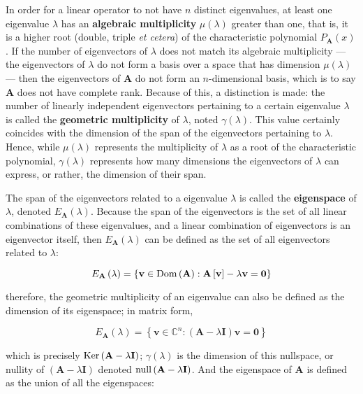 	In order for a linear operator to not have $n$ distinct eigenvalues, at least one eigenvalue $\lambda$ has an \textbf{algebraic multiplicity} $\mu\left(\lambda\right)$ greater than one, that is, it is a higher root (double, triple \textit{et cetera}) of the characteristic polynomial $P_\mathbf{A}(x)$. If the number of eigenvectors of $\lambda$ does not match its algebraic multiplicity — the eigenvectors of $\lambda$ do not form a basis over a space that has dimension $\mu\left(\lambda\right)$ — then the eigenvectors of $\mathbf{A}$ do not form an $n$-dimensional basis, which is to say $\mathbf{A}$ does not have complete rank. Because of this, a distinction is made: the number of linearly independent eigenvectors pertaining to a certain eigenvalue $\lambda$ is called the \textbf{geometric multiplicity} of $\lambda$, noted $\gamma\left(\lambda\right)$. This value certainly coincides with the dimension of the span of the eigenvectors pertaining to $\lambda$. Hence, while $\mu\left(\lambda\right)$ represents the multiplicity of $\lambda$ as a root of the characteristic polynomial, $\gamma\left(\lambda\right)$ represents how many dimensions the eigenvectors of $\lambda$ can express, or rather, the dimension of their span.

	The span of the eigenvectors related to a eigenvalue $\lambda$ is called the \textbf{eigenspace} of $\lambda$, denoted $E_{\mathbf{A}}\left(\lambda\right)$. Because the span of the eigenvectors is the set of all linear combinations of these eigenvalues, and a linear combination of eigenvectors is an eigenvector itself, then $E_\mathbf{A}\left(\lambda\right)$ can be defined as the set of all eigenvectors related to $\lambda$:

\begin{equation} E_\mathbf{A}\left(\lambda\right) = \left\{\mathbf{v}\in\operatorname{Dom}\left(\mathbf{A}\right): \mathbf{A}\left[\mathbf{v}\right] - \lambda\mathbf{v} = \mathbf{0}\right\} \end{equation}

	\noindent therefore, the geometric multiplicity of an eigenvalue can also be defined as the dimension of its eigenspace; in matrix form,

\begin{equation} E_\mathbf{A}\left(\lambda\right) = \left\{\mathbf{v}\in\mathbb{C}^n : \left(\mathbf{A} - \lambda\mathbf{I}\right)\mathbf{v} = \mathbf{0}\right\} \end{equation}

	\noindent which is precisely $\operatorname{Ker}\left(\mathbf{A} - \lambda\mathbf{I}\right)$; $\gamma\left(\lambda\right)$ is the dimension of this nullspace, or nullity of $\left(\mathbf{A} - \lambda\mathbf{I}\right)$ denoted $\operatorname{null}\left(\mathbf{A} - \lambda\mathbf{I}\right)$. And the eigenspace of $\mathbf{A}$ is defined as the union of all the eigenspaces:

